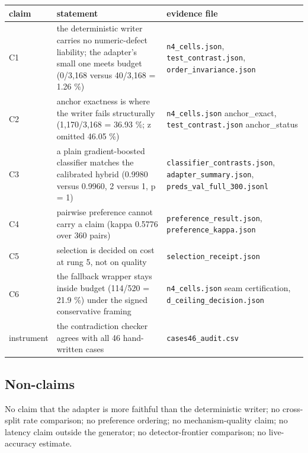 \documentclass[
  10pt,
]{article}
\begin{document}
\begin{longtable}[]{@{}
  >{\raggedright\arraybackslash}p{}
  >{\raggedright\arraybackslash}p{}
  >{\raggedright\arraybackslash}p{}@{}}
\toprule\noalign{}
\begin{minipage}[b]{\linewidth}\raggedright
claim
\end{minipage} & \begin{minipage}[b]{\linewidth}\raggedright
statement
\end{minipage} & \begin{minipage}[b]{\linewidth}\raggedright
evidence file
\end{minipage} \\
\midrule\noalign{}
\endhead
\bottomrule\noalign{}
\endlastfoot
C1 & the deterministic writer carries no numeric-defect liability; the
adapter's small one meets budget (0/3,168 versus 40/3,168 = 1.26 \%) &
\texttt{n4\_cells.json}, \texttt{test\_contrast.json},
\texttt{order\_invariance.json} \\
C2 & anchor exactness is where the writer fails structurally
(1,170/3,168 = 36.93 \%; z omitted 46.05 \%) & \texttt{n4\_cells.json}
anchor\_exact, \texttt{test\_contrast.json} anchor\_status \\
C3 & a plain gradient-boosted classifier matches the calibrated hybrid
(0.9980 versus 0.9960, 2 versus 1, p = 1) &
\texttt{classifier\_contrasts.json}, \texttt{adapter\_summary.json},
\texttt{preds\_val\_full\_300.jsonl} \\
C4 & pairwise preference cannot carry a claim (kappa 0.5776 over 360
pairs) & \texttt{preference\_result.json},
\texttt{preference\_kappa.json} \\
C5 & selection is decided on cost at rung 5, not on quality &
\texttt{selection\_receipt.json} \\
C6 & the fallback wrapper stays inside budget (114/520 = 21.9 \%) under
the signed conservative framing & \texttt{n4\_cells.json} seam
certification, \texttt{d\_ceiling\_decision.json} \\
instrument & the contradiction checker agrees with all 46 hand-written
cases & \texttt{cases46\_audit.csv} \\
\end{longtable}

\subsection{Non-claims}\label{non-claims}

No claim that the adapter is more faithful than the deterministic
writer; no cross-split rate comparison; no preference ordering; no
mechanism-quality claim; no latency claim outside the generator; no
detector-frontier comparison; no live-accuracy estimate.


\end{document}
